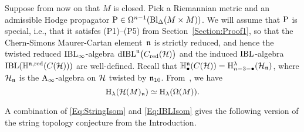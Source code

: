 \documentclass[\MainFolder/Text.tex]{subfiles}
\begin{document}
Suppose from now on that $M$ is closed. Pick a Riemannian metric and an admissible Hodge propagator $\mathrm{P} \in \Omega^{n-1}(\mathrm{Bl}_\Delta(M\times M))$. We will assume that $\mathrm{P}$ is special, i.e., that it satisfes (P1)--(P5) from Section~\ref{Section:Proof1}, so that the Chern-Simons Maurer-Cartan element~$\mathfrak{n}$ is strictly reduced, and hence the twisted reduced $\mathrm{IBL}_\infty$-algebra $\mathrm{dIBL}^{\mathfrak{n}}\bigl(C_{\mathrm{red}}(\mathcal{H})\bigr)$ and the induced $\mathrm{IBL}$-algebra $\mathrm{IBL}(\mathbb{H}^{\mathfrak{n},\mathrm{red}}(C(\mathcal{H})))$ are well-defined.
Recall that $\mathbb{H}^{\mathfrak{n}}_\bullet(C(\mathcal{H})) = \mathrm{H}^{\lambda}_{n-3-\bullet}(\mathcal{H}_{\mathfrak{n}})$, where $\mathcal{H}_{\mathfrak{n}}$ is the $\mathrm{A}_\infty$-algebra on $\mathcal{H}$ twisted by $\mathfrak{n}_{10}$. From~\cite{Cieliebak2018}, we have
\begin{equation}\label{Eq:IBLIsom}
\mathrm{H}_{\lambda}(\mathcal{H}(M)_{\mathfrak{n}}) \simeq \mathrm{H}_{\lambda}(\Omega(M)).
\end{equation}

A combination of \eqref{Eq:StringIsom} and \eqref{Eq:IBLIsom} gives the following version of the string topology conjecture from the Introduction. 
\end{document}
